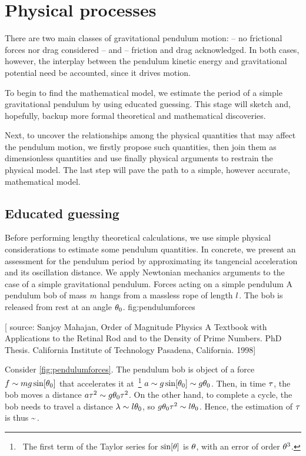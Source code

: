 \section{Physical processes}
There are two main classes of gravitational pendulum motion:  -- no frictional forces nor drag considered -- and  -- friction and drag acknowledged. In both cases, however, the interplay between the pendulum kinetic energy and gravitational potential need be accounted, since it drives motion.

To begin to find the mathematical model, we estimate the period of a simple gravitational pendulum by using educated guessing. This stage will sketch and, hopefully, backup more formal theoretical and mathematical discoveries.

Next, to uncover the relationships among the physical quantities that may affect the pendulum motion, we firstly propose such quantities, then join them as dimensionless quantities and use finally physical arguments to restrain the physical model. The last step will pave the path to a simple, however accurate, mathematical model.


\subsection{Educated guessing}
Before performing lengthy theoretical calculations, we use simple physical considerations to estimate some pendulum quantities. In concrete, we present an assessment for the pendulum period by approximating its tangencial acceleration and its oscillation distance. We apply Newtonian mechanics arguments to the case of a simple gravitational pendulum. 
%
   {Forces acting on a simple pendulum}
   {A pendulum bob of mass $m$ hangs from a massless rope of length $l$. The bob is released from rest at an angle $\theta_0$.}%
   {fig:pendulumforces}%

[ source: Sanjoy Mahajan, Order of Magnitude Physics A Textbook with Applications to the Retinal Rod and to the Density of Prime Numbers. PhD Thesis. California Institute of Technology Pasadena, California. 1998]

Consider \cref{fig:pendulumforces}. The pendulum bob is object of a force $f\sim mg\sin\!\left[{\theta_0}\right]$ that accelerates it at~\footnote{~The first term of the Taylor series for $\sin\!\left[{\theta}\right]$ is $\theta$, with an error of order $\theta^3$.} $a\sim g\sin\!\left[{\theta_0}\right]\sim g\theta_0$. Then, in time $\tau$, the bob moves a distance $a\tau^2\sim g\theta_0\tau^2$. On the other hand, to complete a cycle, the bob needs to travel a distance $\lambda\sim l\theta_0$, so $g\theta_0\tau^2 \sim l\theta_0$. Hence, the estimation of $\tau$ is thus
\beq
\oscper\sim\sqrt{\dfrac{\length}{\grav}}\,.
\eeq

